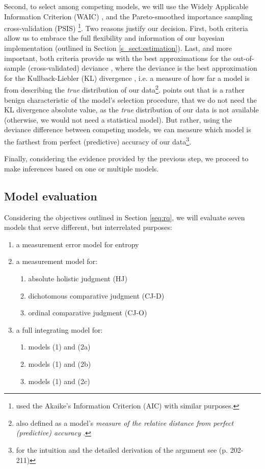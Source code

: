 Second, to select among competing models, we will use the Widely Applicable Information Criterion (WAIC) \citep{Watanabe_2013}, and the Pareto-smoothed importance sampling cross-validation (PSIS) \citep{Vehtari_et_al_2021}\footnote{\citet{vanDaal_2020} used the Akaike’s Information Criterion (AIC) \citep{Akaike_1974} with similar purposes.}. Two reasons justify our decision. First, both criteria allow us to embrace the full flexibility and information of our bayesian implementation (outlined in Section \ref{s_sect:estimation}). Last, and more important, both criteria provide us with the best approximations for the out-of-sample (cross-validated) deviance \citep{McElreath_2020}, where the deviance is the best approximation for the Kullback-Liebler (KL) divergence \citep{Kullback_et_al_1951}, i.e. a measure of how far a model is from describing the \textit{true} distribution of our data\footnote{also defined as a model's \textit{measure of the relative distance from perfect (predictive) accuracy} \citep{McElreath_2020}.}. \citet{McElreath_2020} points out that is a rather benign characteristic of the model's selection procedure, that we do not need the KL divergence absolute value, as the \textit{true} distribution of our data is not available (otherwise, we would not need a statistical model). But rather, using the deviance difference between competing models, we can measure which model is the farthest from perfect (predictive) accuracy of our data\footnote{for the intuition and the detailed derivation of the argument see \citet{McElreath_2020} (p. 202-211)}.

Finally, considering the evidence provided by the previous step, we proceed to make inferences based on one or multiple models.
%
%
\subsection{Model evaluation} \label{s_sec:evaluation}
%
Considering the objectives outlined in Section \ref{seq:rq}, we will evaluate seven models that serve different, but interrelated purposes:
\begin{enumerate} \itemsep1pt
	\item[(1)] a measurement error model for entropy
	\item[(2)] a measurement model for: 
	\begin{enumerate} \itemsep1pt
		\item absolute holistic judgment (HJ)
		\item dichotomous comparative judgment (CJ-D)
		\item ordinal comparative judgment (CJ-O)
	\end{enumerate}
	\item[(3)] a full integrating model for: 
	\begin{enumerate} \itemsep1pt
		\item models (1) and (2a)
		\item models (1) and (2b)
		\item models (1) and (2c)
	\end{enumerate}
\end{enumerate} 
%

